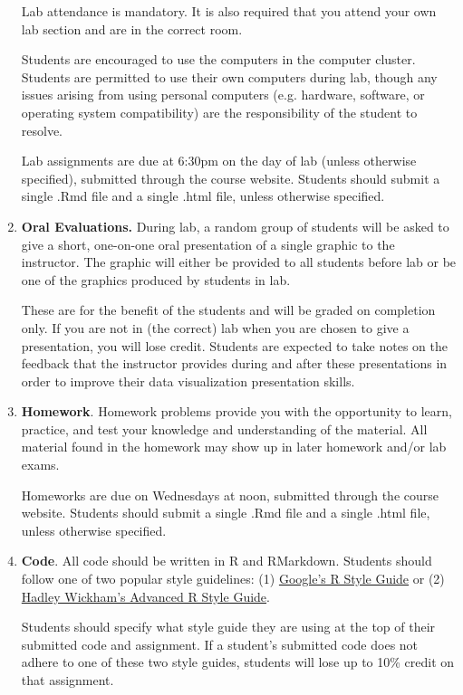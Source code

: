 \documentclass[11pt]{article}
\begin{document}
\begin{enumerate}
Lab attendance is mandatory.  It is also required that you attend your own lab section and are in the correct room.

Students are encouraged to use the computers in the computer cluster.  Students are permitted to use their own computers during lab, though any issues arising from using personal computers (e.g. hardware, software, or operating system compatibility) are the responsibility of the student to resolve.

Lab assignments are due at 6:30pm on the day of lab (unless otherwise specified), submitted through the course website.  Students should submit a single .Rmd file and a single .html file, unless otherwise specified.

\item {\bf Oral Evaluations.} During lab, a random group of students will be asked to give a short, one-on-one oral presentation of a single graphic to the instructor.  The graphic will either be provided to all students before lab or be one of the graphics produced by students in lab.

These are for the benefit of the students and will be graded on completion only.  If you are not in (the correct) lab when you are chosen to give a presentation, you will lose credit.  Students are expected to take notes on the feedback that the instructor provides during and after these presentations in order to improve their data visualization presentation skills.

\item {\bf Homework}. 
Homework problems provide you with the opportunity to learn, practice, and test your knowledge and understanding of the material.  All material found in the homework may show up in later homework and/or lab exams.

Homeworks are due on Wednesdays at noon, submitted through the course website.  Students should submit a single .Rmd file and a single .html file, unless otherwise specified.

\item {\bf Code}.  All code should be written in R and RMarkdown.  Students should follow one of two popular style guidelines:  (1) \href{https://google.github.io/styleguide/Rguide.xml}{Google's R Style Guide} or (2) \href{http://adv-r.had.co.nz/Style.html}{Hadley Wickham's Advanced R Style Guide}.

Students should specify what style guide they are using at the top of their submitted code and assignment.  If a student's submitted code does not adhere to one of these two style guides, students will lose up to 10\% credit on that assignment.


\end{enumerate}
\end{document}
